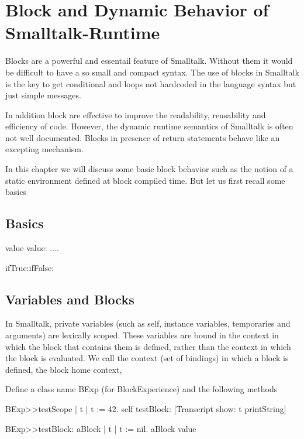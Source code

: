 \documentclass[a4paper,10pt,twoside]{book}
\begin{document}
\fi
\sloppy
\chapter{Block and Dynamic Behavior of Smalltalk-Runtime}
\chapterauthor{\authorsteph{}}

Blocks are a powerful and essentail feature of Smalltalk. Without them it
would be difficult to have a so small and compact syntax. The use of blocks in Smalltalk
is the key to get conditional and loops not hardcoded in the language syntax but just 
simple messages. 

In addition block are  effective to improve the readability, reusability and efficiency of code. 
However, the dynamic runtime semantics of Smalltalk is often not well documented. Blocks in presence of
return statements behave like an excepting mechanism. 

In this chapter we will discuss some basic block behavior such as the notion of a static environment 
defined at block compiled time. But let us first recall some basics

\section{Basics}

value
value:
....

ifTrue:ifFalse: 



\section{Variables and Blocks}
In Smalltalk, private variables (such as self, instance variables, temporaries and arguments) are 
lexically scoped. These variables are bound in the context in which the block that contains them is defined, rather than the context in which the block is evaluated.  We call the context (set of bindings) in which a block is defined, the block home context,

Define a class name BExp (for BlockExperience) and the following methods

\begin{code}{}
BExp>>testScope 
	| t | 
	t := 42. 
	self testBlock: [Transcript show: t printString] 
	
BExp>>testBlock: aBlock 
	| t | 
	t := nil. 
	aBlock value 
\end{code}
\end{document}
